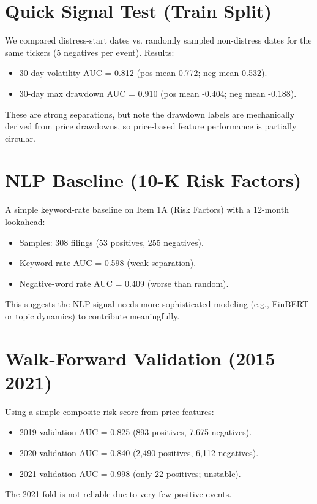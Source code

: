 \documentclass[11pt]{article}
\begin{document}
\section*{Quick Signal Test (Train Split)}
We compared distress-start dates vs. randomly sampled non-distress dates for the same tickers (5 negatives per event). Results:
\begin{itemize}
  \item 30-day volatility AUC = 0.812 (pos mean 0.772; neg mean 0.532).
  \item 30-day max drawdown AUC = 0.910 (pos mean -0.404; neg mean -0.188).
\end{itemize}
These are strong separations, but note the drawdown labels are mechanically derived from price drawdowns, so price-based feature performance is partially circular.

\section*{NLP Baseline (10-K Risk Factors)}
A simple keyword-rate baseline on Item 1A (Risk Factors) with a 12-month lookahead:
\begin{itemize}
  \item Samples: 308 filings (53 positives, 255 negatives).
  \item Keyword-rate AUC = 0.598 (weak separation).
  \item Negative-word rate AUC = 0.409 (worse than random).
\end{itemize}
This suggests the NLP signal needs more sophisticated modeling (e.g., FinBERT or topic dynamics) to contribute meaningfully.

\section*{Walk-Forward Validation (2015--2021)}
Using a simple composite risk score from price features:
\begin{itemize}
  \item 2019 validation AUC = 0.825 (893 positives, 7,675 negatives).
  \item 2020 validation AUC = 0.840 (2,490 positives, 6,112 negatives).
  \item 2021 validation AUC = 0.998 (only 22 positives; unstable).
\end{itemize}
The 2021 fold is not reliable due to very few positive events.
\end{document}
